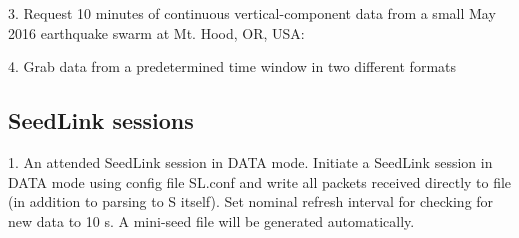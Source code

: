 \documentclass[letterpaper,11pt,english]{sphinxmanual}
\begin{document}
3. Request 10 minutes of continuous vertical-component data from a small May 2016 earthquake swarm at Mt. Hood, OR, USA:

\begin{sphinxVerbatim}[commandchars=\\\{\}]
  
     
      
\end{sphinxVerbatim}

4. Grab data from a predetermined time window in two different formats

\begin{sphinxVerbatim}[commandchars=\\\{\}]
  
  
      
      
\end{sphinxVerbatim}


\subsection{SeedLink sessions}
\label{\detokenize{src/Appendices/examples:seedlink-sessions}}
1. An attended SeedLink session in DATA mode. Initiate a SeedLink session in DATA mode using config file SL.conf and write all packets received directly to file (in addition to parsing to S itself). Set nominal refresh interval for checking for new data to 10 s. A mini-seed file will be generated automatically.
\end{document}
